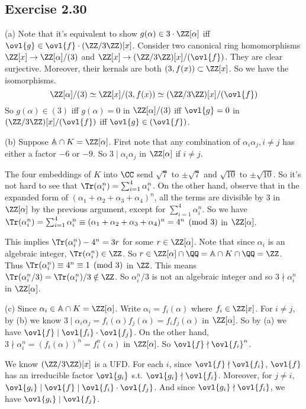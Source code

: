 \documentclass[../Chapter.tex]{subfiles}
\begin{document}
\subsection*{Exercise 2.30}

(a) Note that it's equivalent to show $g(\alpha)\in3\cdot\ZZ[\alpha]$ iff $\ovl{g}\in\ovl{f}\cdot(\ZZ/3\ZZ)[x]$. Consider two canonical ring homomorphisms $\ZZ[x]\to\ZZ[\alpha]/(3)$ and $\ZZ[x]\to(\ZZ/3\ZZ)[x]/(\ovl{f})$. They are clear surjective. Moreover, their kernals are both $(3,f(x))\subset\ZZ[x]$. So we have the isomorphisms. $$\ZZ[\alpha]/(3) \simeq \ZZ[x]/(3,f(x)) \simeq (\ZZ/3\ZZ)[x]/(\ovl{f})$$ So $g(\alpha)\in(3)$ iff $g(\alpha)=0$ in $\ZZ[\alpha]/(3)$ iff $\ovl{g}=0$ in $(\ZZ/3\ZZ)[x]/(\ovl{f})$ iff $\ovl{g}\in(\ovl{f})$.

(b) Suppose $\mathbb{A}\cap K=\ZZ[\alpha]$. First note that any combination of $\alpha_i\alpha_j,i\neq j$ has either a factor $-6$ or $-9$. So $3\mid\alpha_i\alpha_j$ in $\ZZ[\alpha]$ if $i\neq j$.

The four embeddings of $K$ into $\CC$ send $\sqrt{7}$ to $\pm\sqrt{7}$ and $\sqrt{10}$ to $\pm\sqrt{10}$. So it's not hard to see that $\Tr(\alpha_i^n)=\sum_{i=1}^4 \alpha_i^n$. On the other hand, observe that in the expanded form of $(\alpha_1+\alpha_2+\alpha_3+\alpha_4)^n$, all the terms are divisible by $3$ in $\ZZ[\alpha]$ by the previous argument, except for $\sum_{i=1}^4 \alpha_i^n$. So we have $\Tr(\alpha_i^n)=\sum_{i=1}^4 \alpha_i^n \equiv (\alpha_1+\alpha_2+\alpha_3+\alpha_4)^n =4^n \pmod{3}$ in $\ZZ[\alpha]$.

This implies $\Tr(\alpha_i^n)-4^n=3r$ for some $r\in\ZZ[\alpha]$. Note that since $\alpha_i$ is an algebraic integer, $\Tr(\alpha_i^n)\in\ZZ$. So $r\in\ZZ[\alpha]\cap\QQ=\mathbb{A}\cap K\cap\QQ=\ZZ$. Thus $\Tr(\alpha_i^n)\equiv4^n \equiv 1\pmod{3}$ in $\ZZ$. This means $\Tr(\alpha_i^n/3)=\Tr(\alpha_i^n)/3\notin\ZZ$. So $\alpha_i^n/3$ is not an algebraic integer and so $3\nmid \alpha_i^n$ in $\ZZ[\alpha]$.

(c) Since $\alpha_i\in\mathbb{A}\cap K=\ZZ[\alpha]$. Write $\alpha_i=f_i(\alpha)$ where $f_i\in\ZZ[x]$. For $i\neq j$, by (b) we know $3\mid \alpha_i\alpha_j=f_i(\alpha)f_j(\alpha)=f_if_j(\alpha)$ in $\ZZ[\alpha]$. So by (a) we have $\ovl{f}\mid\ovl{f_i}\cdot\ovl{f_j}$. On the other hand, $3\nmid \alpha_i^n=(f_i(\alpha))^n=f_i^n(\alpha)$ in $\ZZ[\alpha]$. So $\ovl{f}\nmid\ovl{f_i}^n$.

We know $(\ZZ/3\ZZ)[x]$ is a UFD. For each $i$, since $\ovl{f}\nmid\ovl{f_i}$, $\ovl{f}$ has an irreducible factor $\ovl{g_i}$ s.t. $\ovl{g_i}\nmid\ovl{f_i}$. Moreover, for $j\neq i$, $\ovl{g_i}\mid\ovl{f}\mid\ovl{f_i}\cdot\ovl{f_j}$. And since $\ovl{g_i}\nmid\ovl{f_i}$, we have $\ovl{g_i}\mid\ovl{f_j}$.
\end{document}
